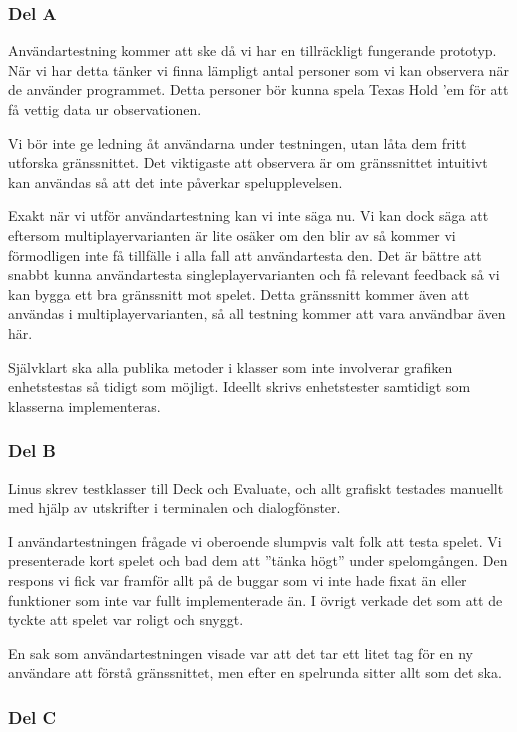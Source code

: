 \documentclass[10pt,a4paper]{article}
\begin{document}
\subsubsection*{Del A}

Användartestning kommer att ske då vi har en tillräckligt fungerande
prototyp. När vi har detta tänker vi finna lämpligt antal personer som vi
kan observera när de använder programmet. Detta personer bör kunna spela
Texas Hold 'em för att få vettig data ur observationen.

Vi bör inte ge ledning åt användarna under testningen, utan låta dem fritt
utforska gränssnittet. Det viktigaste att observera är om gränssnittet
intuitivt kan användas så att det inte påverkar spelupplevelsen.

Exakt när vi utför användartestning kan vi inte säga nu. Vi kan dock säga
att eftersom multiplayervarianten är lite osäker om den blir av så kommer
vi förmodligen inte få tillfälle i alla fall att användartesta den. Det är
bättre att snabbt kunna användartesta singleplayervarianten och få relevant
feedback så vi kan bygga ett bra gränssnitt mot spelet. Detta gränssnitt
kommer även att användas i multiplayervarianten, så all testning kommer att
vara användbar även här.

Självklart ska alla publika metoder i klasser som inte involverar grafiken
enhetstestas så tidigt som möjligt. Ideellt skrivs enhetstester samtidigt
som klasserna implementeras.

\subsubsection*{Del B}

Linus skrev testklasser till Deck och Evaluate, och allt grafiskt testades
manuellt med hjälp av utskrifter i terminalen och dialogfönster.

I användartestningen frågade vi oberoende slumpvis valt folk att testa
spelet. Vi presenterade kort spelet och bad dem att ''tänka högt'' under
spelomgången. Den respons vi fick var framför allt på de buggar som vi inte
hade fixat än eller funktioner som inte var fullt implementerade än. I
övrigt verkade det som att de tyckte att spelet var roligt och snyggt.

En sak som användartestningen visade var att det tar ett litet tag för en
ny användare att förstå gränssnittet, men efter en spelrunda sitter allt
som det ska.

\subsubsection*{Del C}
\end{document}
